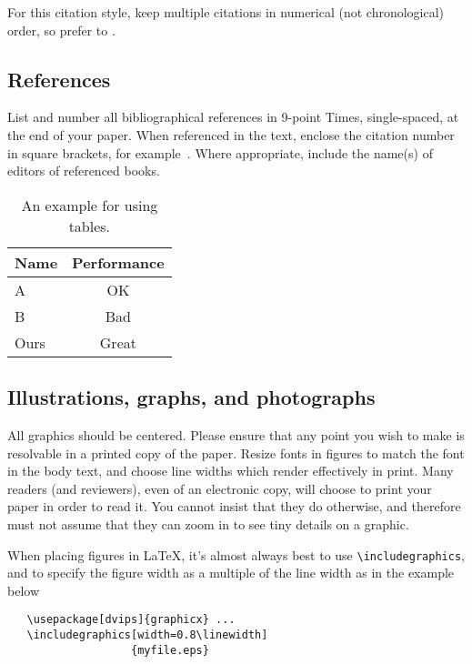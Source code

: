 \documentclass[10pt,twocolumn,letterpaper]{article}
\begin{document}
For this citation style, keep multiple citations in numerical (not
chronological) order, so prefer \cite{Alpher03,Alpher02,Authors12} to
\cite{Alpher02,Alpher03,Authors12}.

\subsection{References}

List and number all bibliographical references in 9-point Times,
single-spaced, at the end of your paper. When referenced in the text,
enclose the citation number in square brackets, for
example~\cite{Authors12}.  Where appropriate, include the name(s) of
editors of referenced books.

\begin{table}
\begin{center}
\begin{tabular}{|l|c|}
\hline
Name & Performance \\
\hline\hline
A & OK\\
B & Bad \\
Ours & Great\\
\hline
\end{tabular}
\end{center}
\caption{An example for using tables.}
\end{table}

\subsection{Illustrations, graphs, and photographs}

All graphics should be centered.  Please ensure that any point you wish to
make is resolvable in a printed copy of the paper.  Resize fonts in figures
to match the font in the body text, and choose line widths which render
effectively in print.  Many readers (and reviewers), even of an electronic
copy, will choose to print your paper in order to read it.  You cannot
insist that they do otherwise, and therefore must not assume that they can
zoom in to see tiny details on a graphic.

When placing figures in \LaTeX, it's almost always best to use
\verb+\includegraphics+, and to specify the  figure width as a multiple of
the line width as in the example below
{\small\begin{verbatim}
   \usepackage[dvips]{graphicx} ...
   \includegraphics[width=0.8\linewidth]
                   {myfile.eps}
\end{verbatim}
}



{\small


}
\end{document}
